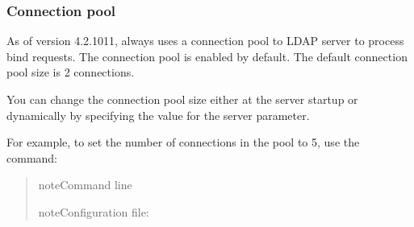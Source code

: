 \documentclass[letterpaper,10pt,english]{sphinxmanual}
\begin{document}
\begin{sphinxVerbatim}[commandchars=\\\{\}]
\end{sphinxVerbatim}
\subsubsection*{Connection pool}

\sphinxAtStartPar
As of version 4.2.10\sphinxhyphen{}11,  always uses a connection pool to LDAP server to process bind requests. The connection pool is enabled by default. The default connection pool size is 2 connections.

\sphinxAtStartPar
You can change the connection pool size either at the server startup or dynamically by specifying the value for the  server parameter.

\sphinxAtStartPar
For example, to set the number of connections in the pool to 5, use the  command:
\begin{quote}

\begin{sphinxadmonition}{note}{Command line}

\begin{sphinxVerbatim}[commandchars=\\\{\}]
\end{sphinxVerbatim}
\end{sphinxadmonition}

\begin{sphinxadmonition}{note}{Configuration file:}

\begin{sphinxVerbatim}[commandchars=\\\{\}]
\end{sphinxVerbatim}
\end{sphinxadmonition}
\end{quote}
\end{document}
